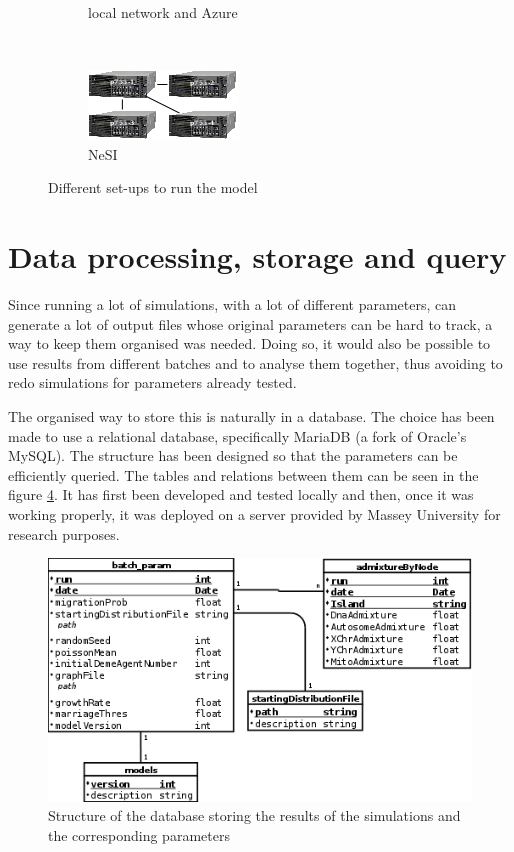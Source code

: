 \documentclass[a4paper,12pt]{report}
\begin{document}
\begin{figure}
\begin{subfigure}[t]{0.48\textwidth}
		\caption{local network and Azure}
		\label{network:azure}
	\end{subfigure}
	~
	\begin{subfigure}[t]{0.48\textwidth}
		\centering
		\includegraphics[scale=1]{../data/network:nesi.png}
		\caption{NeSI}
		\label{network:nesi}
	\end{subfigure}
	\caption{Different set-ups to run the model}
	\label{network}
\end{figure}

\section{Data processing, storage and query}
Since running a lot of simulations, with a lot of different parameters, can generate a lot of output files whose original parameters can be hard to track, a way to keep them organised was needed. Doing so, it would also be possible to use results from different batches and to analyse them together, thus avoiding to redo simulations for parameters already tested.

The organised way to store this is naturally in a database. The choice has been made to use a relational database, specifically MariaDB (a fork of Oracle's MySQL). The structure has been designed so that the parameters can be efficiently queried. The tables and relations between them can be seen in the figure \ref{db}. It has first been developed and tested locally and then, once it was working properly, it was deployed on a server provided by Massey University for research purposes.

\begin{figure}
	\centering
	\includegraphics[scale=0.8]{../data/DB.png}
	\caption{Structure of the database storing the results of the simulations and the corresponding parameters}
	\label{db}
\end{figure}
\end{document}

